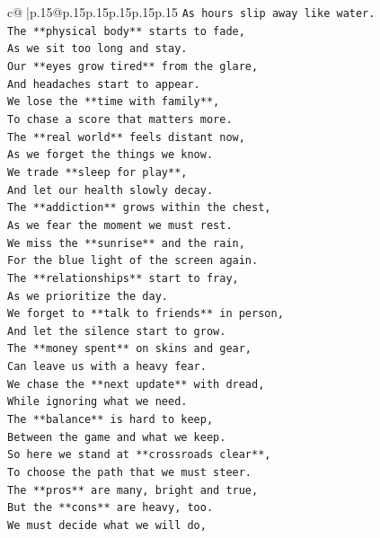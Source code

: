 \documentclass{article}
\begin{document}
{\begin{supertabular}{c@{$\;$}|p{.15\linewidth}@{}p{.15\linewidth}p{.15\linewidth}p{.15\linewidth}p{.15\linewidth}p{.15\linewidth}}
{{{\texttt{As hours slip away like water.} \\
\texttt{The **physical body** starts to fade,} \\
\texttt{As we sit too long and stay.} \\
\texttt{Our **eyes grow tired** from the glare,} \\
\texttt{And headaches start to appear.} \\
\texttt{We lose the **time with family**,} \\
\texttt{To chase a score that matters more.} \\
\texttt{The **real world** feels distant now,} \\
\texttt{As we forget the things we know.} \\
\texttt{We trade **sleep for play**,} \\
\texttt{And let our health slowly decay.} \\
\texttt{The **addiction** grows within the chest,} \\
\texttt{As we fear the moment we must rest.} \\
\texttt{We miss the **sunrise** and the rain,} \\
\texttt{For the blue light of the screen again.} \\
\texttt{The **relationships** start to fray,} \\
\texttt{As we prioritize the day.} \\
\texttt{We forget to **talk to friends** in person,} \\
\texttt{And let the silence start to grow.} \\
\texttt{The **money spent** on skins and gear,} \\
\texttt{Can leave us with a heavy fear.} \\
\texttt{We chase the **next update** with dread,} \\
\texttt{While ignoring what we need.} \\
\texttt{The **balance** is hard to keep,} \\
\texttt{Between the game and what we keep.} \\
\texttt{So here we stand at **crossroads clear**,} \\
\texttt{To choose the path that we must steer.} \\
\texttt{The **pros** are many, bright and true,} \\
\texttt{But the **cons** are heavy, too.} \\
\texttt{We must decide what we will do,} \\
}}}
\end{supertabular}}
\end{document}
